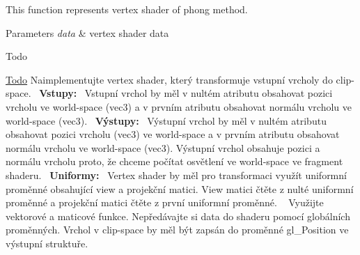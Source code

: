 This function represents vertex shader of phong method. 


\begin{DoxyParams}{Parameters}
{\em data} & vertex shader data \\
\hline
\end{DoxyParams}
\begin{DoxyRefDesc}{Todo}
\item[\hyperlink{todo__todo000002}{Todo}]Naimplementujte vertex shader, který transformuje vstupní vrcholy do clip-\/space.~\newline
 {\bfseries Vstupy\+:}~\newline
 Vstupní vrchol by měl v nultém atributu obsahovat pozici vrcholu ve world-\/space (vec3) a v prvním atributu obsahovat normálu vrcholu ve world-\/space (vec3).~\newline
 {\bfseries Výstupy\+:}~\newline
 Výstupní vrchol by měl v nultém atributu obsahovat pozici vrcholu (vec3) ve world-\/space a v prvním atributu obsahovat normálu vrcholu ve world-\/space (vec3). Výstupní vrchol obsahuje pozici a normálu vrcholu proto, že chceme počítat osvětlení ve world-\/space ve fragment shaderu.~\newline
 {\bfseries Uniformy\+:}~\newline
 Vertex shader by měl pro transformaci využít uniformní proměnné obsahující view a projekční matici. View matici čtěte z nulté uniformní proměnné a projekční matici čtěte z první uniformní proměnné. ~\newline
 Využijte vektorové a maticové funkce. Nepředávajte si data do shaderu pomocí globálních proměnných. Vrchol v clip-\/space by měl být zapsán do proměnné gl\+\_\+\+Position ve výstupní struktuře. \end{DoxyRefDesc}
